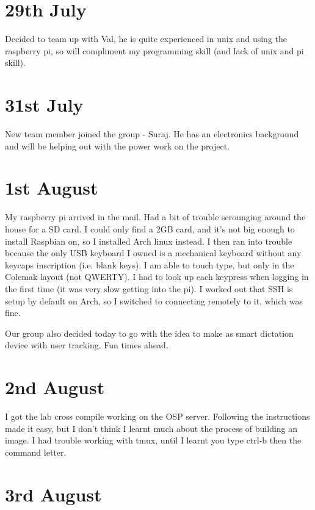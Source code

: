 \section*{29th July}

Decided to team up with Val, he is quite experienced in unix and using the raspberry pi, so will compliment my programming skill (and lack of unix and pi skill).

\section*{31st July}

New team member joined the group - Suraj. He has an electronics background and will be helping out with the power work on the project.



\section*{1st August}

My raspberry pi arrived in the mail. Had a bit of trouble scrounging around the house for a SD card. I could only find a 2GB card, and it's not big enough to install Raspbian on, so I installed Arch linux instead. I then ran into trouble because the only USB keyboard I owned is a mechanical keyboard without any keycaps inscription (i.e. blank keys). I am able to touch type, but only in the Colemak layout (not QWERTY). I had to look up each keypress when logging in the first time (it was very slow getting into the pi). I worked out that SSH is setup by default on Arch, so I switched to connecting remotely to it, which was fine.

Our group also decided today to go with the idea to make as smart dictation device with user tracking. Fun times ahead.


\section*{2nd August}

I got the lab cross compile working on the OSP server. Following the instructions made it easy, but I don't think I learnt much about the process of building an image. I had trouble working with tmux, until I learnt you type ctrl-b then the command letter.


\section*{3rd August}

